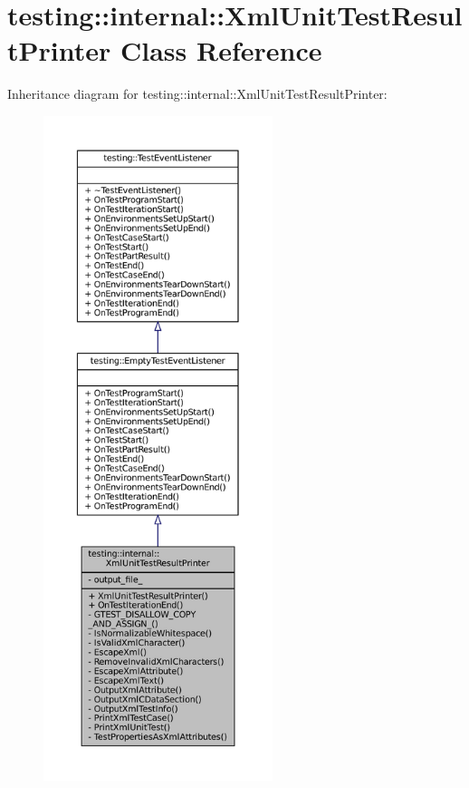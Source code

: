 \hypertarget{classtesting_1_1internal_1_1XmlUnitTestResultPrinter}{}\section{testing\+:\+:internal\+:\+:Xml\+Unit\+Test\+Result\+Printer Class Reference}
\label{classtesting_1_1internal_1_1XmlUnitTestResultPrinter}


Inheritance diagram for testing\+:\+:internal\+:\+:Xml\+Unit\+Test\+Result\+Printer\+:
\nopagebreak
\begin{figure}[H]
\begin{center}
\leavevmode
\includegraphics[height=550pt]{classtesting_1_1internal_1_1XmlUnitTestResultPrinter__inherit__graph}
\end{center}
\end{figure}


